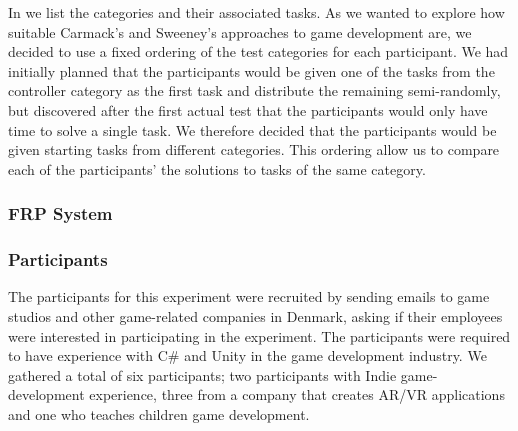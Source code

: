 

 In  we list the categories and their associated tasks. As we wanted to explore how suitable Carmack's and Sweeney's approaches to game development are, we decided to use a fixed ordering of the test categories for each participant. We had initially planned that the participants would be given one of the tasks from the controller category as the first task and distribute the remaining semi-randomly, but discovered after the first actual test that the participants would only have time to solve a single task. We therefore decided that the participants would be given starting tasks from different categories. This ordering allow us to compare each of the participants' the solutions to tasks of the same category.

\subsubsection{FRP System}\label{sec:frp-sys}


\subsubsection{Participants} \label{sec:par-crit}
The participants for this experiment were recruited by sending emails to game studios and other game-related companies in Denmark, asking if their employees were interested in participating in the experiment. The participants were required to have experience with C\# and Unity in the game development industry. We gathered a total of six participants; two participants with Indie game-development experience, three from a company that creates \gls{AR}/\gls{VR} applications and one who teaches children game development.

